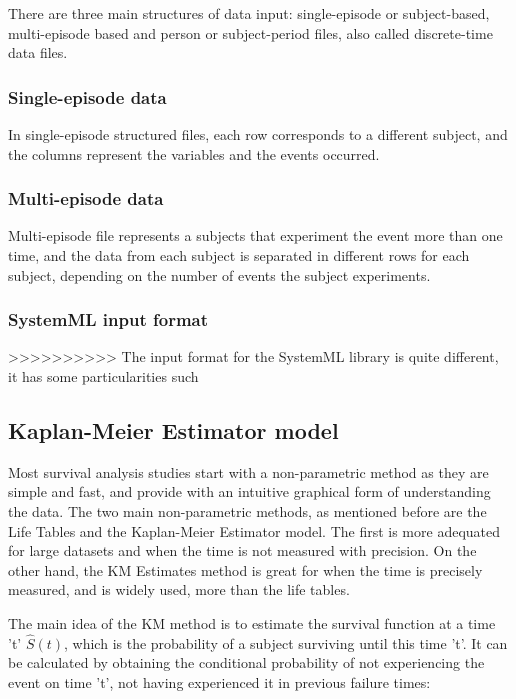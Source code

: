 \documentclass[11pt]{article} %
\begin{document}
      There are three main structures of data input: single-episode or subject-based, multi-episode based and person or subject-period files, also called discrete-time data files.

      \subsubsection*{Single-episode data}

        In single-episode structured files, each row corresponds to a different subject, and the columns represent the variables and the events occurred.

      \subsubsection*{Multi-episode data}

        Multi-episode file represents a subjects that experiment the event more than one time, and the data from each subject is separated in different rows for each subject, depending on the number of events the subject experiments.

    \subsubsection{SystemML input format}

      >>>>>>>>>> The input format for the SystemML library is quite different, it has some particularities such





  \subsection{Kaplan-Meier Estimator model}

    Most survival analysis studies start with a non-parametric method as they are simple and fast, and provide with an intuitive graphical form of understanding the data. The two main non-parametric methods, as mentioned before are the Life Tables and the Kaplan-Meier Estimator model. The first is more adequated for large datasets and when the time is not measured with precision. On the other hand, the KM Estimates method is great for when the time is precisely measured, and is widely used, more than the life tables.

    The main idea of the KM method is to estimate the survival function at a time 't' $\hat{S}(t)$, which is the probability of a subject surviving until this time 't'. It can be calculated by obtaining the conditional probability of not experiencing the event on time 't', not having experienced it in previous failure times:
\end{document}
